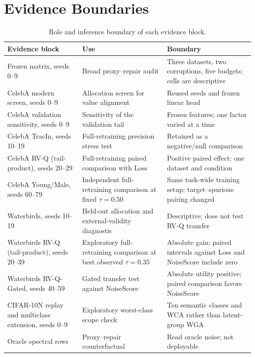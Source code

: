 \documentclass{article}
\begin{document}
\section{Evidence Boundaries}
\label{app:boundaries}

\begin{table}[H]
\caption{Role and inference boundary of each evidence block.}
\centering
\scriptsize
\begin{tabular}{p{}p{}p{}}
\toprule
Evidence block & Use & Boundary \\
\midrule
Frozen matrix, seeds 0--9 & Broad proxy--repair audit & Three datasets, two corruptions, five budgets; cells are descriptive \\
CelebA modern screen, seeds 0--9 & Allocation screen for value alignment & Reused seeds and frozen linear head \\
CelebA validation sensitivity, seeds 0--9 & Sensitivity of the validation tail & Frozen features; one factor varied at a time \\
CelebA TracIn, seeds 10--19 & Full-retraining precision stress test & Retained as a negative/null comparison \\
CelebA RV-Q (tail-product), seeds 20--29 & Full-retraining paired comparison with Loss & Positive paired effect; one dataset and condition \\
CelebA Young/Male, seeds 60--79 & Independent full-retraining comparison at fixed $\tau=0.50$ & Same task-wide training setup; target--spurious pairing changed \\
Waterbirds, seeds 10--19 & Held-out allocation and external-validity diagnostic & Descriptive; does not test RV-Q transfer \\
Waterbirds RV-Q (tail-product), seeds 20--39 & Exploratory full-retraining comparison at best observed $\tau=0.35$ & Absolute gain; paired intervals against Loss and NoiseScore include zero \\
Waterbirds RV-Q-Gated, seeds 40--59 & Gated transfer test against NoiseScore & Absolute utility positive; paired comparison favors NoiseScore \\
CIFAR-10N replay and multiclass extension, seeds 0--9 & Exploratory worst-class scope check & Ten semantic classes and WCA rather than latent-group WGA \\
Oracle spectral rows & Proxy--repair counterfactual & Read oracle noise; not deployable \\
\bottomrule
\end{tabular}
\end{table}
\end{document}
